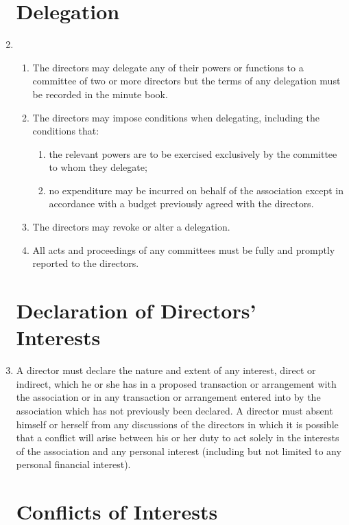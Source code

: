 \begin{enumerate}
\section{Delegation}

\item
  \begin{enumerate}
  \item
    The directors may delegate any of their powers or functions to a
    committee of two or more directors but the terms of any delegation
    must be recorded in the minute book.
  \item
    The directors may impose conditions when delegating, including the
    conditions that:
    \begin{enumerate}
    \item
      the relevant powers are to be exercised exclusively by the
      committee to whom they delegate;
    \item
      no expenditure may be incurred on behalf of the association except in
      accordance with a budget previously agreed with the directors.
    \end{enumerate}
  \item
    The directors may revoke or alter a delegation.
  \item
    All acts and proceedings of any committees must be fully and
    promptly reported to the directors.
  \end{enumerate}

\section{Declaration of Directors' Interests}

\item \label{directors-interests}
  A director must declare the nature and extent of any interest,
  direct or indirect, which he or she has in a proposed transaction
  or arrangement with the association or in any transaction or
  arrangement entered into by the association which has not previously
  been declared. A director must absent himself or herself from any
  discussions of the directors in which it is possible that a
  conflict will arise between his or her duty to act solely in the
      interests of the association and any personal interest (including but
  not limited to any personal financial interest).

\section{Conflicts of Interests}


\end{enumerate}
